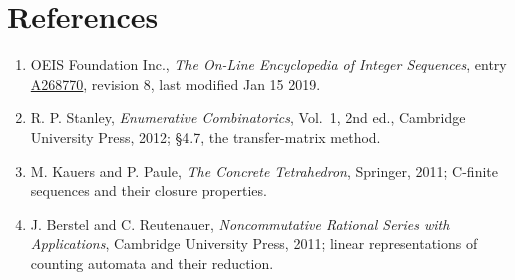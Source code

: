 \documentclass[11pt]{article}
\theoremstyle{definition}
\begin{document}
\section{References}

\begin{enumerate}

\item OEIS Foundation Inc., \emph{The On-Line Encyclopedia of Integer Sequences}, entry \href{https://oeis.org/A268770}{A268770}, revision 8, last modified Jan 15 2019.

\item R. P. Stanley, \emph{Enumerative Combinatorics}, Vol.~1, 2nd ed., Cambridge University Press, 2012; \S4.7, the transfer-matrix method.

\item M. Kauers and P. Paule, \emph{The Concrete Tetrahedron}, Springer, 2011; C-finite sequences and their closure properties.

\item J. Berstel and C. Reutenauer, \emph{Noncommutative Rational Series with Applications}, Cambridge University Press, 2011; linear representations of counting automata and their reduction.

\end{enumerate}
\end{document}
